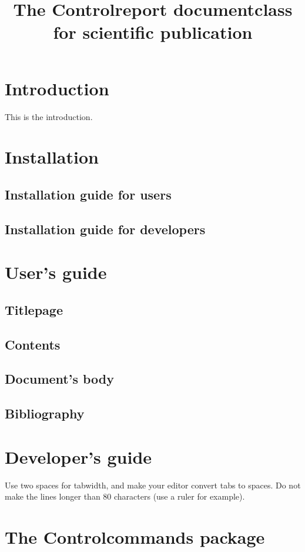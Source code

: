 \documentclass[11pt]{controlreport}
\title{The Controlreport documentclass for scientific publication}
\begin{document}
 	\titlepage	
	
	\contents 
 
 	\chapter{Introduction}

 	This is the introduction.
 	
 	\chapter{Installation}

 	\section{Installation guide for users}
 	
 	\section{Installation guide for developers}

	\chapter{User's guide}
	
	\section{Titlepage}
	
	\section{Contents}
	
	\section{Document's body}
	
	\section{Bibliography}

	\chapter{Developer's guide}

	Use two spaces for tabwidth, and make your editor convert tabs to spaces. Do not make the lines longer than 80 characters (use a ruler for example).

	\chapter{The Controlcommands package}
\end{document}
